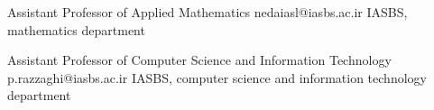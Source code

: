 {Assistant Professor of Applied Mathematics}
{nedaiasl@iasbs.ac.ir} %
{IASBS, mathematics department}

{Assistant Professor of Computer Science and Information Technology}
{p.razzaghi@iasbs.ac.ir} %
{IASBS, computer science and information technology department}